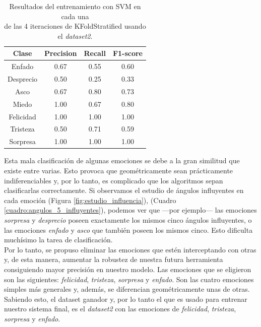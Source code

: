 \begin{table}[h!]
\begin{minipage}{0.48\linewidth}
\begin{adjustbox}{max width=\textwidth}
\begin{tabular}{|c|c|c|c|}
\hline
\textbf{Clase} & \textbf{Precision} & \textbf{Recall} & \textbf{F1-score}\\
\hline
     Enfado & 0.67 & 0.55 & 0.60\\
     Desprecio & 0.50 & 0.25 & 0.33\\
     Asco & 0.67 & 0.80 & 0.73\\
     Miedo & 1.00 & 0.67 & 0.80\\
     Felicidad & 1.00 & 1.00 & 1.00\\
     Tristeza & 0.50 & 0.71 & 0.59\\
     Sorpresa & 1.00 & 1.00 & 1.00\\
\hline
\end{tabular}
\end{adjustbox}
\end{minipage}
\captionsetup{justification=centering}
\caption{Resultados del entrenamiento con SVM en cada una\\
de las 4 iteraciones de KFoldStratified usando el \textit{dataset2}.}
\label{cuadro:resultados_SVM}
\end{table}

Esta mala clasificación de algunas emociones se debe a la gran similitud que existe entre varias. Esto provoca que geométricamente sean prácticamente indiferenciables y, por lo tanto, es complicado que los algoritmos sepan clasificarlas correctamente. Si observamos el estudio de ángulos influyentes en cada emoción (Figura \ref{fig:estudio_influencia}), (Cuadro \ref{cuadro:angulos_5_influyentes}), podemos ver que ---por ejemplo--- las emociones \textit{sorpresa} y \textit{desprecio} poseen exactamente los mismos cinco ángulos influyentes, o las emociones \textit{enfado} y \textit{asco} que también poseen los mismos cinco. Esto dificulta muchísimo la tarea de clasificación.\\

Por lo tanto, se propuso eliminar las emociones que estén interceptando con otras y, de esta manera, aumentar la robustez de nuestra futura herramienta consiguiendo mayor precisión en nuestro modelo. Las emociones que se eligieron son las siguientes: \textit{felicidad}, \textit{tristeza}, \textit{sorpresa} y \textit{enfado}. Son las cuatro emociones simples más generales y, además, se diferencian geométricamente unas de otras. Sabiendo esto, el dataset ganador y, por lo tanto el que es usado para entrenar nuestro sistema final, es el \textit{dataset2} con las emociones de \textit{felicidad}, \textit{tristeza}, \textit{sorpresa} y \textit{enfado}.

